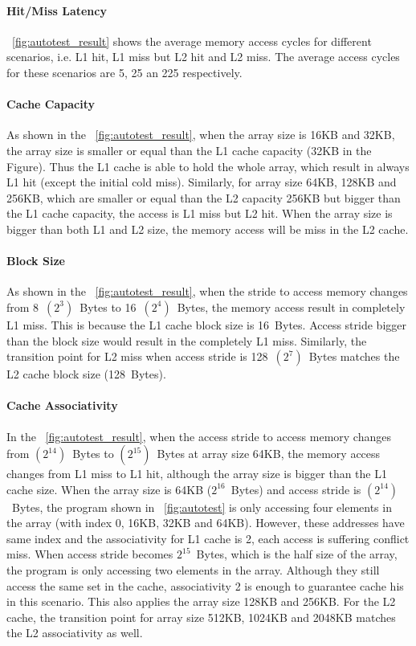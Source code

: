 \documentclass[12pt]{report}
\newcommand{\Fig}[1]{\figurename~\ref{#1}}
\begin{document}
\paragraph{Hit/Miss Latency}
\Fig{fig:autotest_result} shows the average memory access cycles for different scenarios, i.e. L1 hit, L1 miss but L2 hit and L2 miss. The average access cycles for these scenarios are 5, 25 an 225 respectively. 

\paragraph{Cache Capacity}
As shown in the \Fig{fig:autotest_result}, when the array size is 16KB and 32KB, the array size is smaller or equal than the L1 cache capacity (32KB in the Figure). Thus the L1 cache is able to hold the whole array, which result in always L1 hit (except the initial cold miss). Similarly, for array size 64KB, 128KB and 256KB, which are smaller or equal than the L2 capacity 256KB but bigger than the L1 cache capacity, the access is L1 miss but L2 hit. When the array size is bigger than both L1 and L2 size, the memory access will be miss in the L2 cache.

\paragraph{Block Size}
As shown in the \Fig{fig:autotest_result}, when the stride to access memory changes from 8~$(2^3)$~Bytes to 16~$(2^4)$~Bytes, the memory access result in completely L1 miss. This is because the L1 cache block size is 16~Bytes. Access stride bigger than the block size would result in the completely L1 miss. Similarly, the transition point for L2 miss when access stride is 128~$(2^7)$~Bytes matches the L2 cache block size (128~Bytes).

\paragraph{Cache Associativity}
In the \Fig{fig:autotest_result}, when the access stride to access memory changes from $(2^{14})$~Bytes to $(2^{15})$~Bytes at array size 64KB, the memory access changes from L1 miss to L1 hit, although the array size is bigger than the L1 cache size. When the array size is 64KB ($2^{16}$~Bytes) and access stride is $(2^{14})$~Bytes, the program shown in \Fig{fig:autotest} is only accessing four elements in the array (with index 0, 16KB, 32KB and 64KB). However, these addresses have same index and the associativity for L1 cache is 2, each access is suffering conflict miss. When access stride becomes $2^{15}$~Bytes, which is the half size of the array, the program is only accessing two elements in the array. Although they still access the same set in the cache, associativity 2 is enough to guarantee cache his in this scenario. This also applies the array size 128KB and 256KB. For the L2 cache, the transition point for array size 512KB, 1024KB and 2048KB matches the L2 associativity as well.
\end{document}
